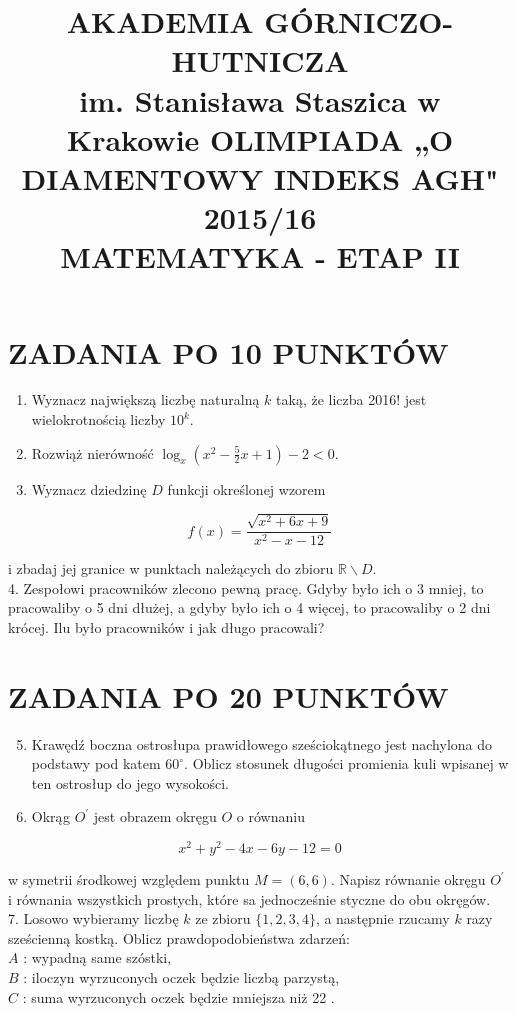 \documentclass[10pt]{article}
\title{AKADEMIA GÓRNICZO-HUTNICZA \\
 im. Stanisława Staszica w Krakowie OLIMPIADA „O DIAMENTOWY INDEKS AGH" 2015/16 \\
 MATEMATYKA - ETAP II }
\author{}
\date{}
\begin{document}
\maketitle
\section*{ZADANIA PO 10 PUNKTÓW}
\begin{enumerate}
  \item Wyznacz największą liczbę naturalną $k$ taką, że liczba 2016! jest wielokrotnością liczby $10^{k}$.
  \item Rozwiąż nierówność $\log _{x}\left(x^{2}-\frac{5}{2} x+1\right)-2<0$.
  \item Wyznacz dziedzinę $D$ funkcji określonej wzorem
\end{enumerate}

$$
f(x)=\frac{\sqrt{x^{2}+6 x+9}}{x^{2}-x-12}
$$

i zbadaj jej granice w punktach należących do zbioru $\mathbb{R} \backslash D$.\\
4. Zespołowi pracowników zlecono pewną pracę. Gdyby było ich o 3 mniej, to pracowaliby o 5 dni dłużej, a gdyby było ich o 4 więcej, to pracowaliby o 2 dni krócej. Ilu było pracowników i jak długo pracowali?

\section*{ZADANIA PO 20 PUNKTÓW}
\begin{enumerate}
  \setcounter{enumi}{4}
  \item Krawędź boczna ostrosłupa prawidłowego sześciokątnego jest nachylona do podstawy pod katem $60^{\circ}$. Oblicz stosunek długości promienia kuli wpisanej w ten ostrosłup do jego wysokości.
  \item Okrąg $O^{\prime}$ jest obrazem okręgu $O$ o równaniu
\end{enumerate}

$$
x^{2}+y^{2}-4 x-6 y-12=0
$$

w symetrii środkowej względem punktu $M=(6,6)$. Napisz równanie okręgu $O^{\prime}$ i równania wszystkich prostych, które sa jednocześnie styczne do obu okręgów.\\
7. Losowo wybieramy liczbę $k$ ze zbioru $\{1,2,3,4\}$, a następnie rzucamy $k$ razy sześcienną kostką. Oblicz prawdopodobieństwa zdarzeń:\\
$A$ : wypadną same szóstki,\\
$B$ : iloczyn wyrzuconych oczek będzie liczbą parzystą,\\
$C$ : suma wyrzuconych oczek będzie mniejsza niż 22 .
\end{document}

